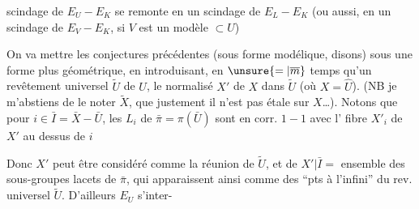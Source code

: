 scindage de $E_U-E_K$ se remonte en un scindage de $E_L-E_K$ (ou aussi,  en un scindage de $E_V-E_K$, si $V$ est un modèle $\subset U$)

On va mettre les conjectures précédentes (sous forme modélique, disons) sous une forme plus géométrique, en introduisant, en $\unsure{=|\overline m}$ temps qu'un revêtement universel  $\widetilde U$ de $U$, le normalisé  $X'$ de $X$ dans $\widetilde U$ (où $X=\widehat U$). (NB je m'abstiens de le noter $\widetilde X$,  que justement il n'est pas étale sur $X$\ldots). Notons que pour $i\in\bar I=\bar X-\bar U$, les  $L_i$ de $\bar\pi=\pi(\bar U)$ sont en corr. $1-1$ avec l' fibre $X'_i$ de $X'$ au dessus de $i$


Donc $X'$ peut être considéré comme la réunion de $\widetilde U$, et de $X'|\bar I=$ ensemble des sous-groupes lacets de $\bar\pi$, qui apparaissent ainsi comme des ``pts à l'infini'' du rev. universel $\widetilde U$. D'ailleurs $E_U$ s'inter-
